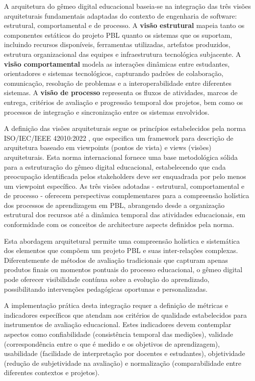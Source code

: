 \documentclass[12pt, a4paper, oneside, brazilian]{abntex2}
\begin{document}
A arquitetura do gêmeo digital educacional baseia-se na integração das três visões arquiteturais fundamentais adaptadas do contexto de engenharia de software: estrutural, comportamental e de processo. A \textbf{visão estrutural} mapeia tanto os componentes estáticos do projeto PBL quanto os sistemas que os suportam, incluindo recursos disponíveis, ferramentas utilizadas, artefatos produzidos, estrutura organizacional das equipes e infraestrutura tecnológica subjacente. A \textbf{visão comportamental} modela as interações dinâmicas entre estudantes, orientadores e sistemas tecnológicos, capturando padrões de colaboração, comunicação, resolução de problemas e a interoperabilidade entre diferentes sistemas. A \textbf{visão de processo} representa os fluxos de atividades, marcos de entrega, critérios de avaliação e progressão temporal dos projetos, bem como os processos de integração e sincronização entre os sistemas envolvidos.

A definição das visões arquiteturais segue os princípios estabelecidos pela norma ISO/IEC/IEEE 42010:2022 \cite{iso42010}, que especifica um framework para descrição de arquitetura baseado em viewpoints (pontos de vista) e views (visões) arquiteturais. Esta norma internacional fornece uma base metodológica sólida para a estruturação do gêmeo digital educacional, estabelecendo que cada preocupação identificada pelos stakeholders deve ser enquadrada por pelo menos um viewpoint específico. As três visões adotadas - estrutural, comportamental e de processo - oferecem perspectivas complementares para a compreensão holística dos processos de aprendizagem em PBL, abrangendo desde a organização estrutural dos recursos até a dinâmica temporal das atividades educacionais, em conformidade com os conceitos de architecture aspects definidos pela norma.

Esta abordagem arquitetural permite uma compreensão holística e sistemática dos elementos que compõem um projeto PBL e suas inter-relações complexas. Diferentemente de métodos de avaliação tradicionais que capturam apenas produtos finais ou momentos pontuais do processo educacional, o gêmeo digital pode oferecer visibilidade contínua sobre a evolução do aprendizado, possibilitando intervenções pedagógicas oportunas e personalizadas.

A implementação prática desta integração requer a definição de métricas e indicadores específicos que atendam aos critérios de qualidade estabelecidos para instrumentos de avaliação educacional. Estes indicadores devem contemplar aspectos como confiabilidade (consistência temporal das medições), validade (correspondência entre o que é medido e os objetivos de aprendizagem), usabilidade (facilidade de interpretação por docentes e estudantes), objetividade (redução de subjetividade na avaliação) e normalização (comparabilidade entre diferentes contextos e projetos).
\end{document}
